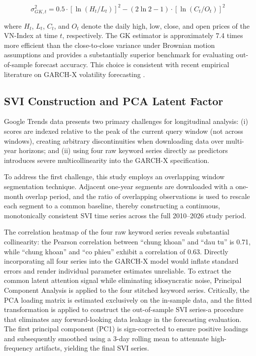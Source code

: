 \documentclass[12pt, a4paper]{article}
\begin{document}
\begin{equation}
\sigma^2_{GK,t} = 0.5 \cdot [\ln(H_t / L_t)]^2 - (2\ln2 - 1) \cdot [\ln(C_t / O_t)]^2
\end{equation}

where $H_t$, $L_t$, $C_t$, and $O_t$ denote the daily high, low, close, and open prices of the VN-Index at time $t$, respectively. The GK estimator is approximately 7.4 times more efficient than the close-to-close variance under Brownian motion assumptions and provides a substantially superior benchmark for evaluating out-of-sample forecast accuracy. This choice is consistent with recent empirical literature on GARCH-X volatility forecasting \citep{diebold1995, patton2011}.

\subsection{SVI Construction and PCA Latent Factor}

Google Trends data presents two primary challenges for longitudinal analysis: (i) scores are indexed relative to the peak of the current query window (not across windows), creating arbitrary discontinuities when downloading data over multi-year horizons; and (ii) using four raw keyword series directly as predictors introduces severe multicollinearity into the GARCH-X specification. 

To address the first challenge, this study employs an overlapping window segmentation technique. Adjacent one-year segments are downloaded with a one-month overlap period, and the ratio of overlapping observations is used to rescale each segment to a common baseline, thereby constructing a continuous, monotonically consistent SVI time series across the full 2010--2026 study period. 

The correlation heatmap of the four raw keyword series reveals substantial collinearity: the Pearson correlation between ``chung khoan'' and ``dau tu'' is 0.71, while ``chung khoan'' and ``co phieu'' exhibit a correlation of 0.63. Directly incorporating all four series into the GARCH-X model would inflate standard errors and render individual parameter estimates unreliable. To extract the common latent attention signal while eliminating idiosyncratic noise, Principal Component Analysis \citep{jolliffe2002} is applied to the four stitched keyword series. Critically, the PCA loading matrix is estimated exclusively on the in-sample data, and the fitted transformation is applied to construct the out-of-sample SVI series-a procedure that eliminates any forward-looking data leakage in the forecasting evaluation. The first principal component (PC1) is sign-corrected to ensure positive loadings and subsequently smoothed using a 3-day rolling mean to attenuate high-frequency artifacts, yielding the final SVI series.
\end{document}
